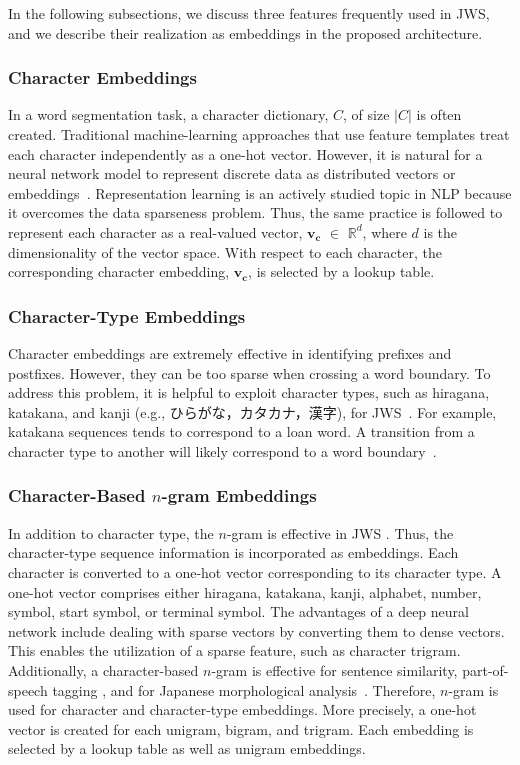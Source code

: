 \documentclass[11pt]{article}
\begin{document}
In the following subsections, we discuss three features frequently used in
JWS, and we describe their realization as embeddings in the proposed
architecture.

\subsubsection{Character Embeddings}

In a word segmentation task, a character dictionary, $C$, of size $|C|$ is
often created. 
Traditional machine-learning approaches that use feature templates treat each
character independently as a one-hot vector.
However, it is natural for a neural network model to represent discrete data
as distributed vectors or
embeddings~\cite{Bengio:2003:NPL:944919.944966,collobert:2008}. Representation
learning is an actively studied topic in NLP because it overcomes the data
sparseness problem. Thus, the same practice is followed to represent each
character as a real-valued vector, $\bm{v_c}$ $\in$ $\mathbb{R}^{d}$, where $d$ is the dimensionality of the vector space. 
With respect to each character, the corresponding character embedding,
$\bm{v_c}$, is selected by a lookup table. 



\subsubsection{Character-Type Embeddings}
Character embeddings are extremely effective in identifying prefixes and
postfixes. However, they can be too sparse when crossing a word boundary.
To address this problem, it is helpful to exploit character types,
such as hiragana, katakana, and kanji (e.g.,
ひらがな，カタカナ，漢字), for JWS~\cite{neubig-nakata-mori:2011:ACL-HLT2011}.
For example, katakana sequences tends to correspond to a loan word. A
transition from a character type to another will likely correspond to a word
boundary~\cite{nagata1999part}.



\subsubsection{Character-Based $n$-gram Embeddings}
In addition to character type, the $n$-gram is effective in JWS \cite{neubig-nakata-mori:2011:ACL-HLT2011}.
Thus, the character-type sequence information is incorporated as embeddings. 
Each character is converted to a one-hot vector corresponding to its character
type. A one-hot vector comprises either hiragana, katakana, kanji,
alphabet, number, symbol, start symbol, or terminal symbol.
The advantages of a deep neural network include dealing with sparse vectors by
converting them to dense vectors.
This enables the utilization of a sparse feature, such as character trigram. 
Additionally, a character-based $n$-gram is effective for sentence similarity,
part-of-speech tagging \cite{wieting-EtAl:2016:EMNLP2016}, and for Japanese
morphological analysis~\cite{neubig-nakata-mori:2011:ACL-HLT2011}. Therefore,
$n$-gram is used for character and character-type embeddings.
More precisely, a one-hot vector is created for each unigram, bigram, and trigram.
Each embedding is selected by a lookup table as well as unigram embeddings.
\end{document}
